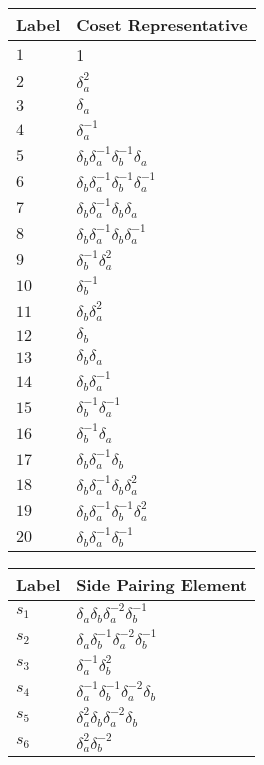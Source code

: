 \documentclass{article}
\begin{document}
\begin{center}
\begin{tabular}{ll}
\toprule
Label & Coset Representative\\
\midrule
$1$ & 1 \\
$2$ & $\delta_a^{2}$ \\
$3$ & $\delta_a^{}$ \\
$4$ & $\delta_a^{-1}$ \\
$5$ & $\delta_b^{}\delta_a^{-1}\delta_b^{-1}\delta_a^{}$ \\
$6$ & $\delta_b^{}\delta_a^{-1}\delta_b^{-1}\delta_a^{-1}$ \\
$7$ & $\delta_b^{}\delta_a^{-1}\delta_b^{}\delta_a^{}$ \\
$8$ & $\delta_b^{}\delta_a^{-1}\delta_b^{}\delta_a^{-1}$ \\
$9$ & $\delta_b^{-1}\delta_a^{2}$ \\
$10$ & $\delta_b^{-1}$ \\
$11$ & $\delta_b^{}\delta_a^{2}$ \\
$12$ & $\delta_b^{}$ \\
$13$ & $\delta_b^{}\delta_a^{}$ \\
$14$ & $\delta_b^{}\delta_a^{-1}$ \\
$15$ & $\delta_b^{-1}\delta_a^{-1}$ \\
$16$ & $\delta_b^{-1}\delta_a^{}$ \\
$17$ & $\delta_b^{}\delta_a^{-1}\delta_b^{}$ \\
$18$ & $\delta_b^{}\delta_a^{-1}\delta_b^{}\delta_a^{2}$ \\
$19$ & $\delta_b^{}\delta_a^{-1}\delta_b^{-1}\delta_a^{2}$ \\
$20$ & $\delta_b^{}\delta_a^{-1}\delta_b^{-1}$ \\
\bottomrule
\end{tabular}
\hfill
\begin{tabular}{ll}
\toprule
Label & Side Pairing Element\\
\midrule
$s_{1}$ & $\delta_a^{}\delta_b^{}\delta_a^{-2}\delta_b^{-1}$ \\
$s_{2}$ & $\delta_a^{}\delta_b^{-1}\delta_a^{-2}\delta_b^{-1}$ \\
$s_{3}$ & $\delta_a^{-1}\delta_b^{2}$ \\
$s_{4}$ & $\delta_a^{-1}\delta_b^{-1}\delta_a^{-2}\delta_b^{}$ \\
$s_{5}$ & $\delta_a^{2}\delta_b^{}\delta_a^{-2}\delta_b^{}$ \\
$s_{6}$ & $\delta_a^{2}\delta_b^{-2}$ \\

\end{tabular}
\end{center}
\end{document}
